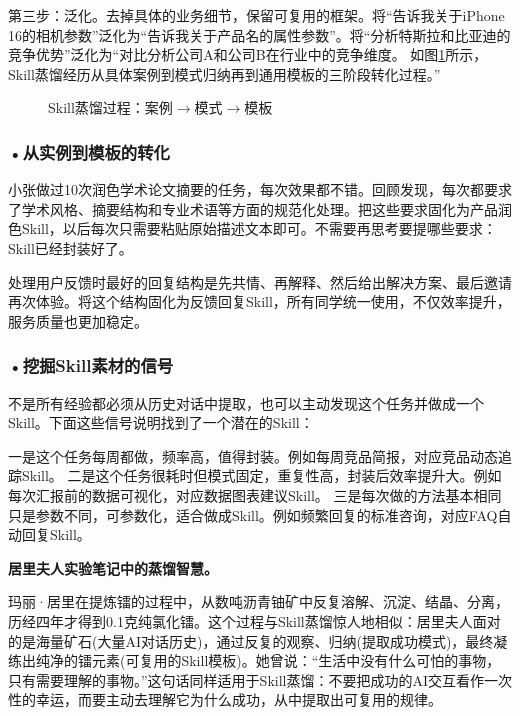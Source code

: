 第三步：泛化。去掉具体的业务细节，保留可复用的框架。将“告诉我关于iPhone 16的相机参数”泛化为“告诉我关于{产品名}的{属性}参数”。将“分析特斯拉和比亚迪的竞争优势”泛化为“对比分析{公司A}和{公司B}在{行业}中的{竞争维度}。 如图\ref{fig:ch3_3_15}所示，Skill蒸馏经历从具体案例到模式归纳再到通用模板的三阶段转化过程。”

\begin{figure}[H]
\centering
{}
\caption{Skill蒸馏过程：案例$\rightarrow$模式$\rightarrow$模板}
\label{fig:ch3_3_15}
\end{figure}


\subsubsection*{\textbf{•从实例到模板的转化}}

小张做过10次润色学术论文摘要的任务，每次效果都不错。回顾发现，每次都要求了学术风格、摘要结构和专业术语等方面的规范化处理。把这些要求固化为产品润色Skill，以后每次只需要粘贴原始描述文本即可。不需要再思考要提哪些要求：Skill已经封装好了。

处理用户反馈时最好的回复结构是先共情、再解释、然后给出解决方案、最后邀请再次体验。将这个结构固化为反馈回复Skill，所有同学统一使用，不仅效率提升，服务质量也更加稳定。


\subsubsection*{\textbf{•挖掘Skill素材的信号}}
不是所有经验都必须从历史对话中提取，也可以主动发现这个任务并做成一个Skill。下面这些信号说明找到了一个潜在的Skill：

一是这个任务每周都做，频率高，值得封装。例如每周竞品简报，对应竞品动态追踪Skill。
二是这个任务很耗时但模式固定，重复性高，封装后效率提升大。例如每次汇报前的数据可视化，对应数据图表建议Skill。
三是每次做的方法基本相同只是参数不同，可参数化，适合做成Skill。例如频繁回复的标准咨询，对应FAQ自动回复Skill。

\begin{funbox}
\textbf{居里夫人实验笔记中的蒸馏智慧。} 

玛丽·居里在提炼镭的过程中，从数吨沥青铀矿中反复溶解、沉淀、结晶、分离，历经四年才得到0.1克纯氯化镭。这个过程与Skill蒸馏惊人地相似：居里夫人面对的是海量矿石(大量AI对话历史)，通过反复的观察、归纳(提取成功模式)，最终凝练出纯净的镭元素(可复用的Skill模板)。她曾说：“生活中没有什么可怕的事物，只有需要理解的事物。”这句话同样适用于Skill蒸馏：不要把成功的AI交互看作一次性的幸运，而要主动去理解它为什么成功，从中提取出可复用的规律。
\end{funbox}

